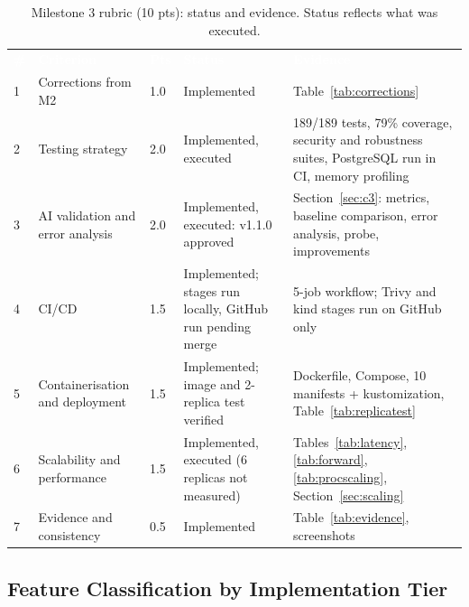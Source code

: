 \documentclass[12pt,a4paper]{article}
\newcommand{\hd}[1]{\textcolor{white}{\textbf{#1}}}
\begin{document}
\begin{table}[H]
\centering
\caption{Milestone 3 rubric (10 pts): status and evidence. Status reflects what was executed.}
\label{tab:rubric}
\renewcommand{\arraystretch}{1.3}
\begin{tabularx}{\textwidth}{C{0.4cm} L{3.4cm} C{0.8cm} L{2.6cm} Y}
\hd{\#} & \hd{Criterion} & \hd{Pts} & \hd{Status} & \hd{Evidence} \\
1 & Corrections from M2 & 1.0 & Implemented & Table~\ref{tab:corrections} \\
2 & Testing strategy & 2.0 & Implemented, executed & 189/189 tests, 79\% coverage, security and robustness suites, PostgreSQL run in CI, memory profiling \\
3 & AI validation and error analysis & 2.0 & Implemented, executed: v1.1.0 approved & Section~\ref{sec:c3}: metrics, baseline comparison, error analysis, probe, improvements \\
4 & CI/CD & 1.5 & Implemented; stages run locally, GitHub run pending merge & 5-job workflow; Trivy and kind stages run on GitHub only \\
5 & Containerisation and deployment & 1.5 & Implemented; image and 2-replica test verified & Dockerfile, Compose, 10 manifests + kustomization, Table~\ref{tab:replicatest} \\
6 & Scalability and performance & 1.5 & Implemented, executed (6 replicas not measured) & Tables~\ref{tab:latency}, \ref{tab:forward}, \ref{tab:procscaling}, Section~\ref{sec:scaling} \\
7 & Evidence and consistency & 0.5 & Implemented & Table~\ref{tab:evidence}, screenshots \\
\end{tabularx}
\end{table}

\subsection{Feature Classification by Implementation Tier}
\end{document}
